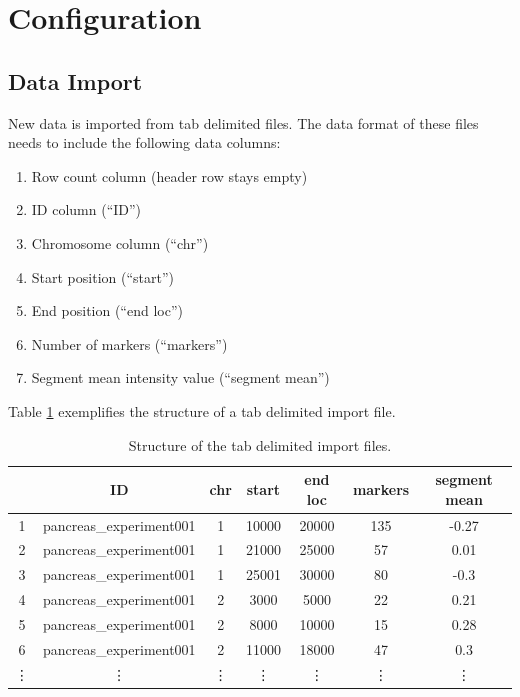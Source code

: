 \documentclass[11pt,final]{article}
\begin{document}
\section{Configuration}

\subsection{Data Import}

New data is imported from tab delimited files. The data format of these files
needs to include the following data columns:

\begin{enumerate}
  \item Row count column (header row stays empty)
  \item ID column (``ID'')
  \item Chromosome column (``chr'')
  \item Start position (``start'')
  \item End position (``end loc'')
  \item Number of markers (``markers'')
  \item Segment mean intensity value (``segment mean'')
\end{enumerate}

Table \ref{tab:tsv} exemplifies the structure of a tab delimited import file.

\begin{table}
	\centering
	\begin{tabular}[h]{|c|c|c|c|c|c|c|}
	  \hline
	  & ID & chr & start & end loc & markers & segment mean \\ \hline
	 1 & pancreas\_experiment001 & 1 & 10000 & 20000 & 135 & -0.27 \\
	 2 & pancreas\_experiment001 & 1 & 21000 & 25000 & 57 & 0.01 \\
	 3 & pancreas\_experiment001 & 1 & 25001 & 30000 & 80 & -0.3 \\
	 4 & pancreas\_experiment001 & 2 & 3000 & 5000 & 22 & 0.21 \\
	 5 & pancreas\_experiment001 & 2 & 8000 & 10000 & 15 & 0.28 \\
	 6 & pancreas\_experiment001 & 2 & 11000 & 18000 & 47 & 0.3 \\
	 \vdots & \vdots & \vdots & \vdots & \vdots & \vdots & \vdots \\
	\end{tabular}
	\caption{Structure of the tab delimited import files.}
	\label{tab:tsv}
\end{table}
\end{document}
